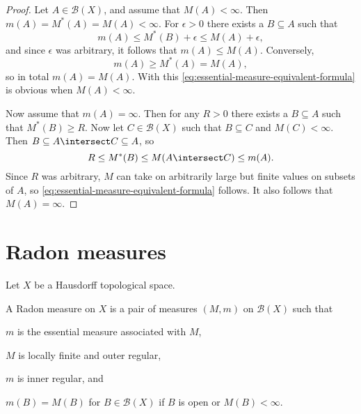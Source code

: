 \documentclass[article, a4paper, 11pt, oneside]{memoir}
\numberwithin{equation}{chapter}
\newcommand{\calB}{\mathcal{B}}
\newcommand{\borel}[1]{\calB(#1)}
\begin{document}
\begin{proof}
    Let $A \in \borel{X}$, and assume that $M(A) < \infty$. Then $m(A) = M^*(A) = M(A) < \infty$. For $\epsilon > 0$ there exists a $B \subseteq A$ such that
    \begin{equation*}
        m(A)
            \leq M^*(B) + \epsilon
            \leq M(A) + \epsilon,
    \end{equation*}
    and since $\epsilon$ was arbitrary, it follows that $m(A) \leq M(A)$. Conversely,
    \begin{equation*}
        m(A)
            \geq M^*(A)
            = M(A),
    \end{equation*}
    so in total $m(A) = M(A)$. With this \eqref{eq:essential-measure-equivalent-formula} is obvious when $M(A) < \infty$.

    Now assume that $m(A) = \infty$. Then for any $R > 0$ there exists a $B \subseteq A$ such that $M^*(B) \geq R$. Now let $C \in \borel{X}$ such that $B \subseteq C$ and $M(C) < \infty$. Then $B \subseteq A \intersect C \subseteq A$, so
    \begin{equation*}
        R
            \leq M^*(B)
            \leq M(A \intersect C)
            \leq m(A).
    \end{equation*}
    Since $R$ was arbitrary, $M$ can take on arbitrarily large but finite values on subsets of $A$, so \eqref{eq:essential-measure-equivalent-formula} follows. It also follows that $M(A) = \infty$.
\end{proof}



\chapter{Radon measures}

Let $X$ be a Hausdorff topological space.

\begin{definition}
    A Radon measure on $X$ is a pair of measures $(M,m)$ on $\borel{X}$ such that
    \begin{enumdef}
        \item $m$ is the essential measure associated with $M$,

        \item $M$ is locally finite and outer regular,

        \item $m$ is inner regular, and

        \item $m(B) = M(B)$ for $B \in \borel{X}$ if $B$ is open or $M(B) < \infty$.
    \end{enumdef}
\end{definition}
\end{document}
